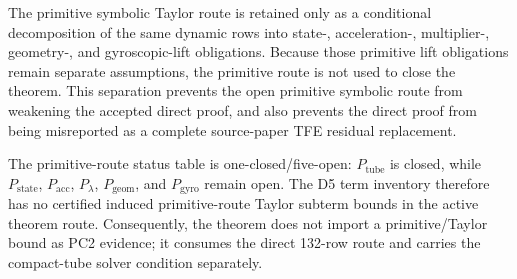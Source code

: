 \documentclass[preprint,12pt]{elsarticle}
\newcommand{\tfe}{TFE}
\begin{document}
The primitive symbolic
Taylor route is retained only as a conditional decomposition of the same
dynamic rows into state-, acceleration-, multiplier-, geometry-, and
gyroscopic-lift obligations. Because those primitive lift obligations remain
separate assumptions, the primitive route is not used to close the theorem.
This separation prevents the open primitive symbolic route from weakening the
accepted direct proof, and also prevents the direct proof from being
misreported as a complete source-paper \tfe{} residual replacement.

The primitive-route status table is one-closed/five-open:
\(P_{\mathrm{tube}}\) is closed, while \(P_{\mathrm{state}}\),
\(P_{\mathrm{acc}}\), \(P_{\lambda}\), \(P_{\mathrm{geom}}\), and
\(P_{\mathrm{gyro}}\) remain open.  The D5 term inventory therefore has no
certified induced primitive-route Taylor subterm bounds in the active theorem
route.
Consequently, the theorem does not import a primitive/Taylor bound as PC2
evidence; it consumes the direct 132-row route and carries the compact-tube
solver condition separately.
\end{document}
